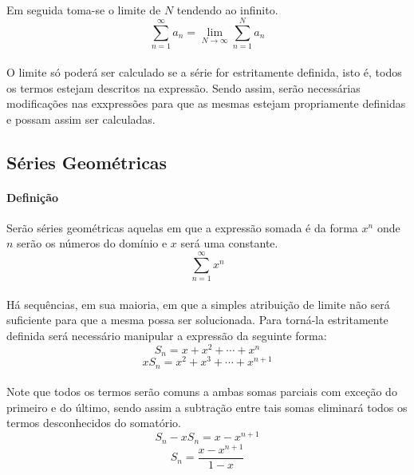\documentclass{article}
\begin{document}
            \paragraph{}Em seguida toma-se o limite de $N$ tendendo ao infinito.
            \begin{equation}
                \sum\limits_{n=1}^{\infty}a_n=\lim\limits_{N\to\infty}\sum\limits_{n=1}^{N}a_n
            \end{equation}
            \paragraph{}O limite só poderá ser calculado se a série for estritamente definida, isto é, todos os termos estejam descritos na expressão. Sendo assim, serão necessárias modificações nas exxpressões para que as mesmas estejam propriamente definidas e possam assim ser calculadas.
        
        \subsection{Séries Geométricas}
            \paragraph{Definição}Serão séries geométricas aquelas em que a expressão somada é da forma $x^{n}$ onde $n$ serão os números do domínio e $x$ será uma constante.
                \begin{equation}
                    \sum\limits_{n=1}^{\infty}x^n
                \end{equation}
            \paragraph{}Há sequências, em sua maioria, em que a simples atribuição de limite não será suficiente para que a mesma possa ser solucionada. Para torná-la estritamente definida será necessário manipular a expressão da seguinte forma:
                \begin{equation}
                    S_n=x+x^2+\cdots+x^n
                \end{equation}
                \begin{equation}
                    xS_n=x^2+x^3+\cdots+x^{n+1}
                \end{equation}
            \paragraph{}Note que todos os termos serão comuns a ambas somas parciais com exceção do primeiro e do último, sendo assim a subtração entre tais somas eliminará todos os termos desconhecidos do somatório.
                \begin{equation}
                    S_n-xS_n=x-x^{n+1}
                \end{equation}
                \begin{equation}
                    S_n=\frac{x-x^{n+1}}{1-x}
                \end{equation}
\end{document}
